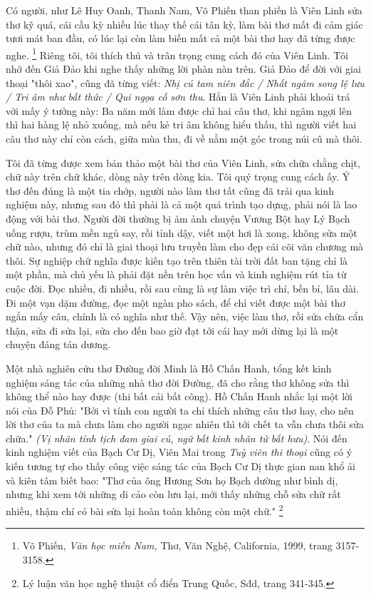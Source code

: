 \documentclass[../main.tex]{subfiles}
\begin{document}
\begin{multicols}{2}
Có người, như Lê Huy Oanh, Thanh Nam, Võ Phiến than phiền là Viên Linh sửa thơ kỹ quá, cái cầu kỳ nhiều lúc thay thế cái tân kỳ, làm bài thơ mất đi cảm giác tươi mát ban đầu, có lúc lại còn làm biến mất cả một bài thơ hay đã từng được nghe. \footnote{
Võ Phiến, \textit{Văn học miền Nam, }Thơ, Văn Nghệ, California, 1999, trang 3157-3158.}  Riêng tôi, tôi thích thú và trân trọng cung cách đó của Viên Linh. Tôi nhớ đến Giả Đảo khi nghe thấy những lời phàn nàn trên. Giả Đảo để đời với giai thoại "thôi xao", cũng đã từng viết: \textit{Nhị cú tam niên đắc / Nhất ngâm song lệ lưu / Tri âm như bất thức / Qui ngọa cố sơn thu}. Hẳn là Viên Linh phải khoái trá với mấy ý tưởng này: Ba năm mới làm được chỉ hai câu thơ, khi ngâm ngợi lên thì hai hàng lệ nhỏ xuống, mà nếu kẻ tri âm không hiểu thấu, thì người viết hai câu thơ này chỉ còn cách, giữa mùa thu, đi về nằm một góc trong núi cũ mà thôi. 
 
Tôi đã từng được xem bản thảo một bài thơ của Viên Linh, sửa chữa chằng chịt, chữ này trên chữ khác, dòng này trên dòng kia. Tôi quý trọng cung cách ấy. Ý thơ đến đúng là một tia chớp, người nào làm thơ tất cũng đã trải qua kinh nghiệm này, nhưng sau đó thì phải là cả một quá trình tạo dựng, phải nói là lao động với bài thơ. Người đời thường bị ám ảnh chuyện Vương Bột hay Lý Bạch uống rượu, trùm mền ngủ say, rồi tỉnh dậy, viết một hơi là xong, không sửa một chữ nào, nhưng đó chỉ là giai thoại lưu truyền làm cho đẹp cái cõi văn chương mà thôi. Sự nghiệp chữ nghĩa được kiến tạo trên thiên tài trời đất ban tặng chỉ là một phần, mà chủ yếu là phải đặt nền trên học vấn và kinh nghiệm rút tỉa từ cuộc đời. Đọc nhiều, đi nhiều, rồi sau cùng là sự làm việc trì chí, bền bỉ, lâu dài. Đi một vạn dặm đường, đọc một ngàn pho sách, để chỉ viết được một bài thơ ngắn mấy câu, chính là có nghĩa như thế. Vậy nên, việc làm thơ, rồi sửa chữa cẩn thận, sửa đi sửa lại, sửa cho đến bao giờ đạt tới cái hay mới dừng lại là một chuyện đáng tán dương. 
 
Một nhà nghiên cứu thơ Đường đời Minh là Hồ Chấn Hanh, tổng kết kinh nghiệm sáng tác của những nhà thơ đời Đường, đã cho rằng thơ không sửa thì không thể nào hay được (thi bất cải bất công). Hồ Chấn Hanh nhắc lại một lời nói của Đỗ Phủ: "Bởi vì tính con người ta chỉ thích những câu thơ hay, cho nên lời thơ của ta mà chưa làm cho người ngạc nhiên thì tới chết ta vẫn chưa thôi sửa chữa." \textit{(Vị nhân tính tịch đam giai cú, ngữ bất kinh nhân tử bất hưu)}. Nói đến kinh nghiệm viết của Bạch Cư Dị, Viên Mai trong \textit{Tuỳ viên thi thoại} cũng có ý kiến tương tự cho thấy công việc sáng tác của Bạch Cư Dị thực gian nan khổ ải và kiên tâm biết bao: "Thơ của ông Hương Sơn họ Bạch dường như bình dị, nhưng khi xem tới những di cảo còn lưu lại, mới thấy những chỗ sửa chữ rất nhiều, thậm chí có bài sửa lại hoàn toàn không còn một chữ." \footnote{
Lý luận văn học nghệ thuật cổ điển Trung Quốc, Sđd, trang 341-345.}  
 

\end{multicols}
\end{document}
